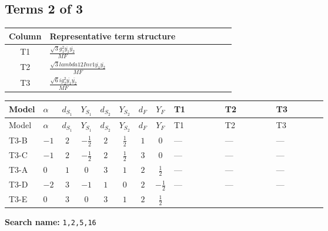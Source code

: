 \documentclass[8pt]{article}
\begin{document}
\begin{landscape}
\subsection*{Terms 2 of 3}
\begin{center}
\begin{tabular}{@{}c >{\raggedright\arraybackslash}p{0.82\linewidth}@{}}
\toprule
Column & Representative term structure \\
\midrule
T1 & \(\displaystyle \frac{\sqrt{3} g_{1}^{2} \overline{y_{1}} \overline{y_{2}}}{MF}\) \\
\midrule
T2 & \(\displaystyle \frac{\sqrt{3} lambda12Inv1 \overline{y_{1}} \overline{y_{2}}}{MF}\) \\
\midrule
T3 & \(\displaystyle \frac{\sqrt{6} i g_{2}^{2} \overline{y_{1}} \overline{y_{2}}}{MF}\) \\
\midrule
\bottomrule
\end{tabular}
\end{center}
\smallskip
\tiny
\begin{longtable}{@{}llcccccc >{\raggedright\arraybackslash}p{0.21\linewidth} >{\raggedright\arraybackslash}p{0.21\linewidth} >{\raggedright\arraybackslash}p{0.21\linewidth}@{}}
\toprule
Model & $\alpha$ & $d_{S_1}$ & $Y_{S_1}$ & $d_{S_2}$ & $Y_{S_2}$ & $d_F$ & $Y_F$ & T1 & T2 & T3 \\
\midrule
\endfirsthead
\toprule
Model & $\alpha$ & $d_{S_1}$ & $Y_{S_1}$ & $d_{S_2}$ & $Y_{S_2}$ & $d_F$ & $Y_F$ & T1 & T2 & T3 \\
\midrule
\endhead
T3-B & $-1$ & $2$ & $-\frac{1}{2}$ & $2$ & $\frac{1}{2}$ & $1$ & $0$ & --- & --- & --- \\
\midrule
T3-C & $-1$ & $2$ & $-\frac{1}{2}$ & $2$ & $\frac{1}{2}$ & $3$ & $0$ & --- & --- & --- \\
\midrule
T3-A & $0$ & $1$ & $0$ & $3$ & $1$ & $2$ & $\frac{1}{2}$ & --- & --- & --- \\
\midrule
T3-D & $-2$ & $3$ & $-1$ & $1$ & $0$ & $2$ & $-\frac{1}{2}$ & --- & --- & --- \\
\midrule
T3-E & $0$ & $3$ & $0$ & $3$ & $1$ & $2$ & $\frac{1}{2}$ & \scriptsize\adjustbox{max width=\linewidth}{$\begin{gathered} - \frac{\sqrt{3} g_{1}^{2} \overline{y_{1}} \overline{y_{2}}}{8 MF}\end{gathered}$} & \scriptsize\adjustbox{max width=\linewidth}{$\begin{gathered} \frac{\sqrt{3} lambda12Inv1 \overline{y_{1}} \overline{y_{2}}}{6 MF}\end{gathered}$} & \scriptsize\adjustbox{max width=\linewidth}{$\begin{gathered} - \frac{\sqrt{6} i g_{2}^{2} \overline{y_{1}} \overline{y_{2}}}{6 MF}\end{gathered}$} \\
\midrule
\bottomrule
\end{longtable}
\clearpage
\noindent\textbf{Search name: }\texttt{1,2,5,16}\par\smallskip

\end{landscape}
\end{document}
